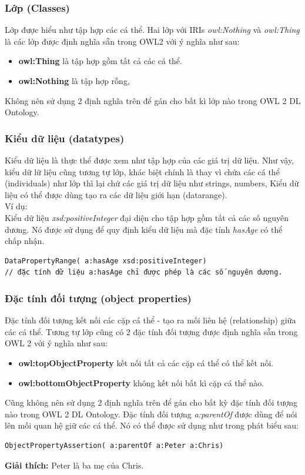\subsubsection{Lớp (Classes)}
Lớp được hiểu như tập hợp các cá thể. Hai lớp với IRIs \textit{owl:Nothing} và \textit{owl:Thing} là các lớp được định nghĩa sẵn trong OWL2 với ý nghĩa như sau:
\begin{itemize}
\item \textbf{owl:Thing} là tập hợp gồm tất cả các cá thể.
\item \textbf{owl:Nothing} là tập hợp rỗng,
\end{itemize}
Không nên sử dụng 2 định nghĩa trên để gán cho bất kì lớp nào trong OWL 2 DL Ontology.
\subsubsection{Kiểu dữ liệu (datatypes)}
Kiểu dữ liệu là thực thể được xem như tập hợp của các giá trị dữ liệu. Như vậy, kiểu dữ lữ liệu cũng tương tự lớp, khác biệt chính là thay vì chứa các cá thể (individuals) như lớp thì lại chứ các giá trị dữ liệu như strings, numbers, Kiểu dữ liệu có thể được dùng tạo ra các dữ liệu giới hạn (datarange).
\\
Ví dụ:
\\
Kiểu dữ liệu \textit{xsd:positiveInteger} đại diện cho tập hợp gồm tất cả các số nguyên dương. Nó được sử dụng để quy định kiểu dữ liệu mà đặc tính \textit{hasAge} có thể chấp nhận.
\begin{verbatim}
DataPropertyRange( a:hasAge xsd:positiveInteger) 
// đặc tính dữ liệu a:hasAge chỉ được phép là các số nguyên dương.
\end{verbatim}
\subsubsection{Đặc tính đối tượng (object properties)} 
Đặc tính đối tượng kết nối các cặp cá thể - tạo ra mối liên hệ (relationship) giữa các cá thể. Tương tự lớp cũng có 2 đặc tính đối tượng được định nghĩa sẵn trong OWL 2 với ý nghĩa như sau:
\begin{itemize}
\item \textbf{owl:topObjectProperty} kết nối tất cả các cặp cá thể có thể kết nối.
\item \textbf{owl:bottomObjectProperty} không kết nối bất kì cặp cá thể nào. 
\end{itemize}
Cũng không nên sử dụng 2 định nghĩa trên để gán cho bất kỳ đặc tính đối tượng nào trong OWL 2 DL Ontology. Đặc tính đối tượng \textit{a:parentOf} được dùng để nói lên mối quan hệ giữ các cá thể. Nó có thể được sử dụng như trong phát biểu sau:
\begin{verbatim}
ObjectPropertyAssertion( a:parentOf a:Peter a:Chris)  
\end{verbatim}
\textbf{Giải thích:} Peter là ba mẹ của Chris.

